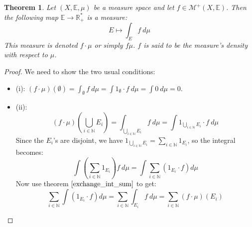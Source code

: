 \documentclass[12pt, a4paper]{article}
\newtheorem{theorem}{Theorem}[section]
\numberwithin{equation}{section}
\begin{document}
\begin{theorem}
Let $(X,\mathbb{E},\mu)$ be a measure space and let $f\in\mathcal{M}^+(X,\mathbb{E})$. Then the following map $\mathbb{E}\rightarrow\mathbb{R}^*_+$ is a measure:
\begin{equation}
E\mapsto\int_E f\ d\mu
\end{equation}
This measure is denoted $f\cdot\mu$ or simply $f\mu$. $f$ is said to be the measure's density with respect to $\mu$.
\end{theorem}
\begin{proof}
We need to show the two usual conditions:
\begin{itemize}
\item (i): $(f\cdot\mu)(\emptyset)=\int_\emptyset f\ d\mu=\int 1_\emptyset\cdot f\ d\mu=\int 0\ d\mu=0$.
\item (ii):
\begin{equation}
(f\cdot\mu)\left(\bigcup_{i\in\mathbb{N}} E_i \right)=\int_{\bigcup_{i\in\mathbb{N}} E_i} f\ d\mu=\int 1_{\bigcup_{i\in\mathbb{N}} E_i}\cdot f\ d\mu
\end{equation}
Since the $E_i$'s are disjoint, we have $1_{\bigcup_{i\in\mathbb{N}} E_i}=\sum_{i\in\mathbb{N}} 1_{E_i}$, so the integral becomes:
\begin{equation}
\int\left(\sum_{i\in\mathbb{N}} 1_{E_i}\right)f\ d\mu=\int\sum_{i\in\mathbb{N}}(1_{E_i}\cdot f)d\mu
\end{equation}
Now use theorem $\ref{exchange_int_sum}$ to get:
\begin{equation}
\sum_{i\in\mathbb{N}}\int(1_{E_i}\cdot f)d\mu=\sum_{i\in\mathbb{N}}\int_{E_i}f\ d\mu=\sum_{i\in\mathbb{N}}(f\cdot\mu)(E_i)
\end{equation}
\end{itemize}
\end{proof}
\end{document}
